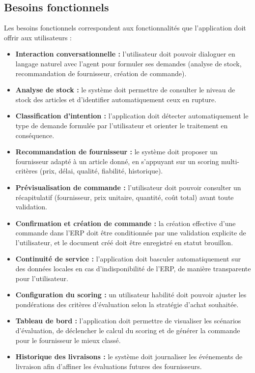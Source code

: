 \subsection{Besoins fonctionnels}
Les besoins fonctionnels correspondent aux fonctionnalités que l'application doit offrir aux utilisateurs :
\begin{itemize}
    \item \textbf{Interaction conversationnelle :} l'utilisateur doit pouvoir dialoguer en langage naturel avec l'agent pour formuler ses demandes (analyse de stock, recommandation de fournisseur, création de commande).
    \item \textbf{Analyse de stock :} le système doit permettre de consulter le niveau de stock des articles et d'identifier automatiquement ceux en rupture.
    \item \textbf{Classification d'intention :} l'application doit détecter automatiquement le type de demande formulée par l'utilisateur et orienter le traitement en conséquence.
    \item \textbf{Recommandation de fournisseur :} le système doit proposer un fournisseur adapté à un article donné, en s'appuyant sur un scoring multi-critères (prix, délai, qualité, fiabilité, historique).
    \item \textbf{Prévisualisation de commande :} l'utilisateur doit pouvoir consulter un récapitulatif (fournisseur, prix unitaire, quantité, coût total) avant toute validation.
    \item \textbf{Confirmation et création de commande :} la création effective d'une commande dans l'ERP doit être conditionnée par une validation explicite de l'utilisateur, et le document créé doit être enregistré en statut brouillon.
    \item \textbf{Continuité de service :} l'application doit basculer automatiquement sur des données locales en cas d'indisponibilité de l'ERP, de manière transparente pour l'utilisateur.
    \item \textbf{Configuration du scoring :} un utilisateur habilité doit pouvoir ajuster les pondérations des critères d'évaluation selon la stratégie d'achat souhaitée.
    \item \textbf{Tableau de bord :} l'application doit permettre de visualiser les scénarios d'évaluation, de déclencher le calcul du scoring et de générer la commande pour le fournisseur le mieux classé.
    \item \textbf{Historique des livraisons :} le système doit journaliser les événements de livraison afin d'affiner les évaluations futures des fournisseurs.
\end{itemize}

